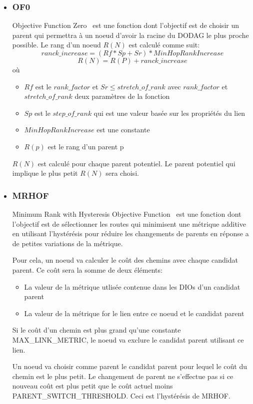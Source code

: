 \begin{itemize}
    \item \subsubsection*{OF0}
            Objective Function Zero~\cite{rfc:of0} est une fonction dont l'objectif est de choisir un parent qui permettra à un noeud d'avoir la racine du DODAG le plus proche possible. Le rang d'un noeud $R(N)$ est calculé comme suit:
                \[ranck\_increase = (Rf * Sp + Sr) * MinHopRankIncrease\]
                \[R(N) = R(P) + ranck\_increase\]
                où
                \begin{itemize}
                    \item $Rf$ est le $rank\_factor$ et $Sr \leq stretch\_of\_rank$ avec $rank\_factor$ et $stretch\_of\_rank$ deux paramètres de la fonction
                    \item $Sp$ est le $step\_of\_rank$ qui est une valeur basée sur les propriétés du lien
                    \item $MinHopRankIncrease$ est une constante
                    \item $R(p)$ est le rang d'un parent p
                \end{itemize}
                $R(N)$ est calculé pour chaque parent potentiel. Le parent potentiel qui implique le plus petit $R(N)$ sera choisi.
                
    \item \subsubsection*{MRHOF}%
            Minimum Rank with Hysteresis Objective Function~\cite{rfc:mrhof} est une fonction dont l'objectif est de sélectionner les routes qui minimisent une métrique additive en utilisant l'hystérésis
            pour réduire les changements de parents en réponse a de petites variations de la métrique.
            
            Pour cela, un noeud va calculer le coût des chemins avec chaque candidat parent. Ce coût sera la somme de deux éléments:
            \begin{itemize}
                \item La valeur de la métrique utlisée contenue dans les DIOs d'un candidat parent
                \item La valeur de la métrique for le lien entre ce noeud et le candidat parent
            \end{itemize}
            Si le coût d'un chemin est plus grand qu'une constante \textsc{MAX\_LINK\_METRIC}, 
            le noeud va exclure le candidat parent utilisant ce lien.

            Un noeud va choisir comme parent le candidat parent pour lequel le coût du chemin est le plus petit. Le changement de parent ne s'effectue pas si ce nouveau coût est plus petit que le coût actuel moins \textsc{PARENT\_SWITCH\_THRESHOLD}. Ceci est l'hystérésis
            de MRHOF.
\end{itemize}


